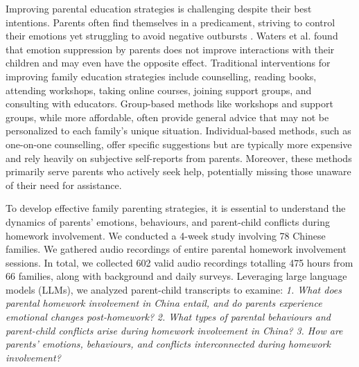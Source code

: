 Improving parental education strategies is challenging despite their best intentions. Parents often find themselves in a predicament, striving to control their emotions yet struggling to avoid negative outbursts \cite{mcewan2004deal}. Waters et al. \cite{waters2020keep} found that emotion suppression by parents does not improve interactions with their children and may even have the opposite effect. Traditional interventions for improving family education strategies include counselling, reading books, attending workshops, taking online courses, joining support groups, and consulting with educators. Group-based methods like workshops and support groups, while more affordable, often provide general advice that may not be personalized to each family's unique situation. Individual-based methods, such as one-on-one counselling, offer specific suggestions but are typically more expensive and rely heavily on subjective self-reports from parents. Moreover, these methods primarily serve parents who actively seek help, potentially missing those unaware of their need for assistance. 


To develop effective family parenting strategies, it is essential to understand the dynamics of parents' emotions, behaviours, and parent-child conflicts during homework involvement. We conducted a 4-week study involving 78 Chinese families. We gathered audio recordings of entire parental homework involvement sessions. In total, we collected 602 valid audio recordings totalling 475 hours from 66 families, along with background and daily surveys. Leveraging large language models (LLMs), we analyzed parent-child transcripts to examine:
\textit{1. What does parental homework involvement in China entail, and do parents experience emotional changes post-homework?}
\textit{2. What types of parental behaviours and parent-child conflicts arise during homework involvement in China?}
\textit{3. How are parents' emotions, behaviours, and conflicts interconnected during homework involvement?}


